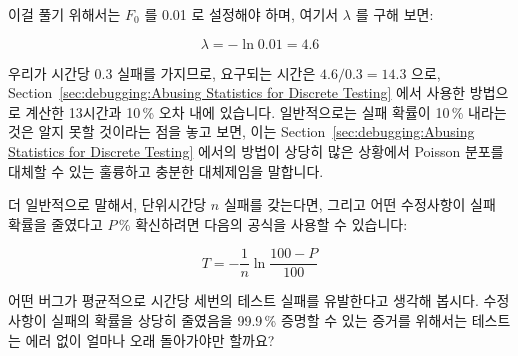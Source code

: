 이걸 풀기 위해서는 $F_0$ 를 0.01 로 설정해야 하며, 여기서 $\lambda$ 를 구해
보면:

\begin{equation}
	\lambda = - \ln 0.01 = 4.6
\end{equation}

우리가 시간당 $0.3$ 실패를 가지므로, 요구되는 시간은 $4.6/0.3 = 14.3$ 으로,
Section~\ref{sec:debugging:Abusing Statistics for Discrete Testing} 에서 사용한
방법으로 계산한 13시간과 10\,\% 오차 내에 있습니다.
일반적으로는 실패 확률이 10\,\% 내라는 것은 알지 못할 것이라는 점을 놓고 보면,
이는
Section~\ref{sec:debugging:Abusing Statistics for Discrete Testing} 에서의
방법이 상당히 많은 상황에서 Poisson 분포를 대체할 수 있는 훌륭하고 충분한
대체제임을 말합니다.

더 일반적으로 말해서, 단위시간당 $n$ 실패를 갖는다면, 그리고 어떤 수정사항이
실패 확률을 줄였다고 $P$\,\% 확신하려면 다음의 공식을 사용할 수 있습니다:

\begin{equation}
	T = - \frac{1}{n} \ln \frac{100 - P}{100}
\label{eq:debugging:Error-Free Test Duration}
\end{equation}

\QuickQuiz{}
	어떤 버그가 평균적으로 시간당 세번의 테스트 실패를 유발한다고 생각해
	봅시다.
	수정사항이 실패의 확률을 상당히 줄였음을 99.9\,\% 증명할 수 있는 증거를
	위해서는 테스트는 에러 없이 얼마나 오래 돌아가야만 할까요?
	\iffalse

